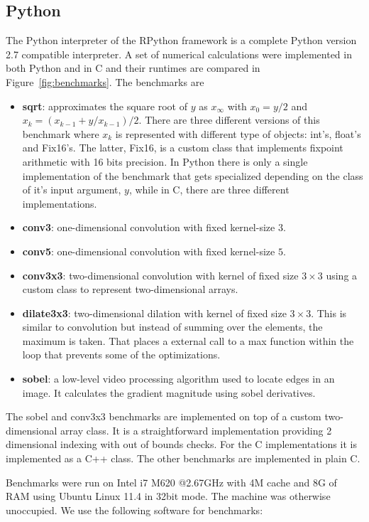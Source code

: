 \documentclass[preprint]{sigplanconf}
\begin{document}
\subsection{Python}
The Python interpreter of the RPython framework is a complete Python
version 2.7 compatible interpreter. A set of numerical
calculations were implemented in both Python and in C and their
runtimes are compared in Figure~\ref{fig:benchmarks}. The benchmarks are
\begin{itemize}
\item {\bf sqrt}: approximates the square root of $y$ as $x_\infty$
  with $x_0=y/2$ and $x_k = \left( x_{k-1} + y/x_{k-1} \right) /
  2$. There are three different versions of this benchmark where $x_k$
  is represented with different type of objects: int's, float's and
  Fix16's. The latter, Fix16, is a custom class that implements
  fixpoint arithmetic with 16 bits precision. In Python there is only
  a single implementation of the benchmark that gets specialized
  depending on the class of it's input argument, $y$, while in C,
  there are three different implementations.
\item {\bf conv3}: one-dimensional convolution with fixed kernel-size $3$.
\item {\bf conv5}: one-dimensional convolution with fixed kernel-size $5$.
\item {\bf conv3x3}: two-dimensional convolution with kernel of fixed
  size $3 \times 3$ using a custom class to represent two-dimensional
  arrays.
\item {\bf dilate3x3}: two-dimensional dilation with kernel of fixed
  size $3 \times 3$. This is similar to convolution but instead of
  summing over the elements, the maximum is taken. That places a
  external call to a max function within the loop that prevents some
  of the optimizations.
\item {\bf sobel}: a low-level video processing algorithm used to
  locate edges in an image. It calculates the gradient magnitude
  using sobel derivatives. 
\end{itemize}

The sobel and conv3x3 benchmarks are implemented
on top of a custom two-dimensional array class.
It is
a straightforward implementation providing 2 dimensional
indexing with out of bounds checks. For the C implementations it is
implemented as a C++ class. The other benchmarks are implemented in
plain C. 

Benchmarks were run on Intel i7 M620 @2.67GHz with 4M cache and 8G of RAM
using Ubuntu Linux 11.4 in 32bit mode.
The machine was otherwise unoccupied. We use the following software
for benchmarks:
\end{document}
